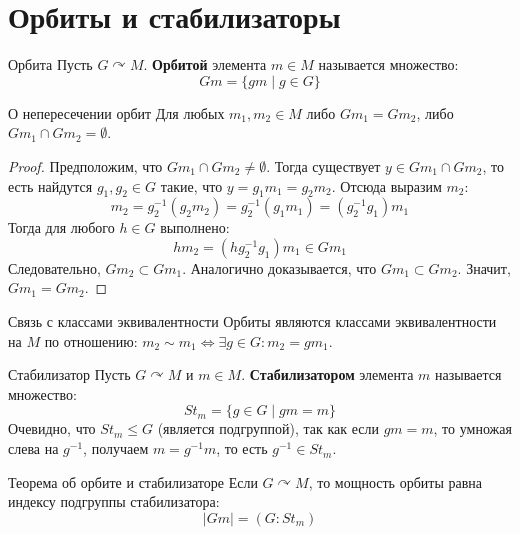\section{Орбиты и стабилизаторы}

\begin{Definition}{Орбита}{}
	Пусть $G \curvearrowright M$.
	\textbf{Орбитой} элемента $m \in M$ называется множество:
	\[ Gm = \{gm \mid g \in G\} \] 
\end{Definition}

\begin{Lemma}{О непересечении орбит}{}
	Для любых $m_1, m_2 \in M$ либо $Gm_1 = Gm_2$, либо $Gm_1 \cap Gm_2 = \emptyset$.
\end{Lemma}

\begin{proof}
	Предположим, что $Gm_1 \cap Gm_2 \neq \emptyset$. Тогда существует $y \in Gm_1 \cap Gm_2$, то есть найдутся $g_1, g_2 \in G$ такие, что $y = g_1 m_1 = g_2 m_2$.
	Отсюда выразим $m_2$:
	\[ m_2 = g_2^{-1}(g_2 m_2) = g_2^{-1}(g_1 m_1) = (g_2^{-1}g_1)m_1 \] 
	Тогда для любого $h \in G$ выполнено:
	\[ h m_2 = (h g_2^{-1}g_1)m_1 \in Gm_1 \] 
	Следовательно, $Gm_2 \subset Gm_1$.
	Аналогично доказывается, что $Gm_1 \subset Gm_2$. Значит, $Gm_1 = Gm_2$.
\end{proof}

\begin{Remark}{Связь с классами эквивалентности}{}
	Орбиты являются классами эквивалентности на $M$ по отношению: $m_2 \sim m_1 \iff \exists g \in G \colon m_2 = gm_1$.
\end{Remark}

\begin{Definition}{Стабилизатор}{}
	Пусть $G \curvearrowright M$ и $m \in M$. \textbf{Стабилизатором} элемента $m$ называется множество:
	\[ St_m = \{g \in G \mid gm = m\} \] 
	Очевидно, что $St_m \le G$ (является подгруппой), так как если $gm=m$, то умножая слева на $g^{-1}$, получаем $m = g^{-1}m$, то есть $g^{-1} \in St_m$.
\end{Definition}

\begin{Proposition}{Теорема об орбите и стабилизаторе}{}
	Если $G \curvearrowright M$, то мощность орбиты равна индексу подгруппы стабилизатора:
	\[ |Gm| = (G : St_m) \]
\end{Proposition}

